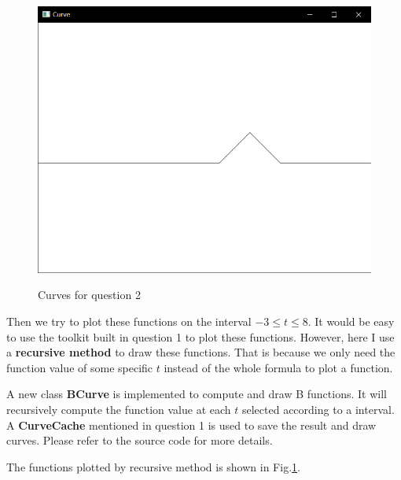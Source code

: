 \documentclass[12pt,a4paper]{article}
\theoremstyle{definition}
\numberwithin{equation}{section}
\numberwithin{figure}{section}
\begin{document}
\begin{figure}[p]
{		\label{figb22}
		\includegraphics[width=0.27\linewidth]{B22.png}
	}
	\quad
	\quad
	\quad
	\caption{Curves for question 2}
	\label{fig2}
\end{figure}
Then we try to plot these functions on the interval $-3\leq t \leq 8$. It would be easy to use the toolkit built in question 1 to plot these functions. However, here I use a \textbf{recursive method} to draw these functions. That is because we only need the function value of some specific $t$ instead of the whole formula to plot a function.

A new class \textbf{BCurve} is implemented to compute and draw B functions. It will recursively compute the function value at each $t$ selected according to a interval. A \textbf{CurveCache} mentioned in question 1 is used to save the result and draw curves. Please refer to the source code for more details.

The functions plotted by recursive method is shown in Fig.\ref{fig2}.


%
\end{document}
